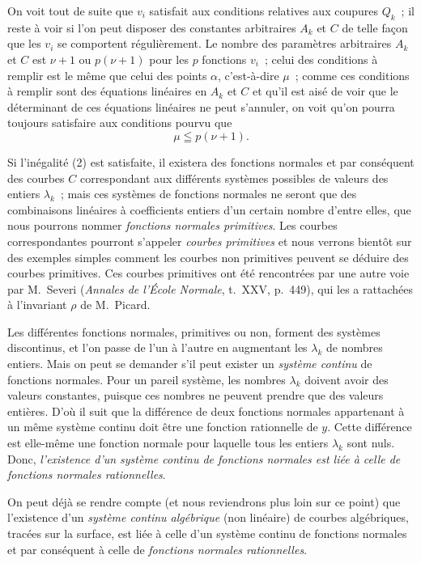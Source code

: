 \documentclass{article}
\begin{document}
On voit tout de suite que $v_{i}$ satisfait aux conditions relatives aux coupures $Q_{k}$~; il reste à voir si l'on peut disposer des constantes arbitraires $A_{k}$ et $C$ de telle façon que les $v_{i}$ se comportent régulièrement. Le nombre des paramètres arbitraires $A_{k}$ et $C$ est $\nu + 1$ ou $p(\nu + 1)$ pour les $p$ fonctions $v_{i}$~; celui des conditions à remplir est le même que celui des points $\alpha$, c'est-à-dire $\mu$~; comme ces conditions à remplir sont des équations linéaires en $A_{k}$ et $C$ et qu'il est aisé de voir que le
déterminant de ces équations linéaires ne peut s'annuler, on voit qu'on pourra toujours satisfaire aux conditions pourvu que
\[
\mu \leqq p(\nu + 1). \tag{2}
\]

Si l'inégalité (2) est satisfaite, il existera des fonctions normales et par conséquent des courbes $C$ correspondant aux différents systèmes possibles de valeurs des entiers $\lambda_{k}$~; mais ces systèmes de fonctions normales ne seront que des combinaisons linéaires à coefficients entiers d'un certain nombre d'entre elles, que nous pourrons nommer \emph{fonctions normales primitives}. Les courbes correspondantes pourront s'appeler \emph{courbes primitives} et nous verrons bientôt sur des exemples simples comment les courbes non primitives peuvent se déduire des courbes primitives. Ces courbes primitives ont été rencontrées par une autre voie par M.~Severi (\emph{Annales de l'École Normale}, t.~XXV, p.~449), qui les a rattachées à l'invariant $\rho$ de M.~Picard.

Les différentes fonctions normales, primitives ou non, forment des systèmes discontinus, et l'on passe de l'un à l'autre en augmentant les $\lambda_{k}$ de nombres entiers. Mais on peut se demander s'il peut exister un \emph{système continu} de fonctions normales. Pour un pareil système, les nombres $\lambda_{k}$ doivent avoir des valeurs constantes, puisque ces nombres ne peuvent prendre que des valeurs entières. D'où il suit que la différence de deux fonctions normales appartenant à un même système continu doit être une fonction rationnelle de $y$. Cette différence est elle-même une fonction normale pour laquelle tous les entiers $\lambda_{k}$ sont nuls. Donc, \emph{l'existence d'un système continu de fonctions normales est liée à celle de fonctions normales rationnelles}.

On peut déjà se rendre compte (et nous reviendrons plus loin sur ce point) que l'existence d'un \emph{système continu algébrique} (non linéaire) de courbes algébriques, tracées sur la surface, est liée à celle d'un système continu de fonctions normales et par conséquent à celle de \emph{fonctions normales rationnelles}.
\end{document}
